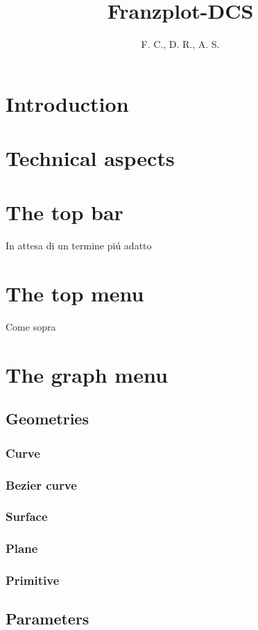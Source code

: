 \documentclass{article}
\title{Franzplot-DCS}
\author{F. C., D. R., A. S.}
\begin{document}
\maketitle
\tableofcontents
\newpage
\section{Introduction}\label{s:intro}
\section{Technical aspects}\label{s:tech_asp}
\section{The top bar}\label{s:top_bar}
In attesa di un termine pi\'u adatto
\section{The top menu}\label{s:top_menu}
Come sopra
\section{The graph menu}\label{s:graph_menu}
\subsection{Geometries}\label{ss:geometries}
\subsubsection{Curve}\label{sss:curve}
\subsubsection{Bezier curve}\label{sss:bez_curve}
\subsubsection{Surface}\label{sss:surface}
\subsubsection{Plane}\label{sss:plane}
\subsubsection{Primitive}\label{sss:primitive}
\subsection{Parameters}\label{ss:parameters}
\end{document}
